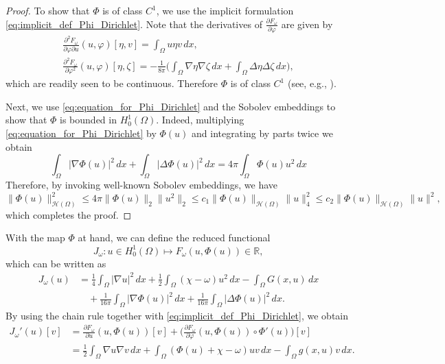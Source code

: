 \documentclass[reqno]{amsart}
\begin{document}
\begin{proof}
To show that $\Phi$ is of class $C^1$, we use the implicit formulation 
\eqref{eq:implicit_def_Phi_Dirichlet}. Note that the derivatives of 
$\frac{\partial F_\omega}{\partial \varphi}$ are given by
\begin{equation}
\begin{gathered}
  \frac{\partial^2 F_\omega}{\partial \varphi \partial u} (u, \varphi)[\eta, v]
  = \int_\Omega u \eta v \,dx,  \\
  \frac{\partial^2 F_\omega}{\partial \varphi^2} (u, \varphi) [\eta, \zeta]
   = - \frac{1}{8\pi} \Big(\int_\Omega \nabla \eta \nabla \zeta \,dx
   + \int_\Omega \Delta \eta \Delta \zeta \,dx \Big),
\end{gathered}
\end{equation}
which are readily seen to be continuous. Therefore $\Phi$ is of class $C^1$
(see, e.g., \cite{AmbrosettiProdi1993}).

Next, we  use \eqref{eq:equation_for_Phi_Dirichlet} and the Sobolev embeddings to 
show that $\Phi$ is bounded in $H_0^1(\Omega)$. Indeed, multiplying 
\eqref{eq:equation_for_Phi_Dirichlet} by $\Phi(u)$ and integrating by parts twice we 
obtain
\[
 \int_\Omega |\nabla \Phi(u)|^2 \,dx + \int_\Omega |\Delta \Phi(u)|^2 \,dx = 4 \pi \int_\Omega \Phi(u) u^2 \,dx
\]
Therefore, by invoking well-known Sobolev embeddings, we have
\[
 \|\Phi(u)\|_{\mathcal{H}(\Omega)}^2
  \leq 4 \pi \|\Phi(u)\|_2 \|u^2\|_2  
  \leq c_1 \|\Phi(u)\|_{\mathcal{H}(\Omega)} \|u\|_4^2
  \leq c_2 \|\Phi(u)\|_{\mathcal{H}(\Omega)} \|u\|^2,
\]
 which completes the proof.
\end{proof}

With the map $\Phi$ at hand, we can define the  reduced functional
\[
 J_\omega : u \in H_0^1(\Omega) \mapsto F_\omega(u, \Phi(u)) \in \mathbb R,
\]
which can be written as
\begin{equation}
\begin{aligned}
 J_\omega(u)
 & = \frac{1}{4} \int_\Omega |\nabla u|^2 \,dx
  + \frac{1}{2} \int_\Omega (\chi - \omega) u^2 \,dx
  - \int_\Omega G(x, u) \,dx  \\
 & \quad + \frac{1}{16 \pi} \int_\Omega |\nabla \Phi(u)|^2 \,dx
 + \frac{1}{16 \pi} \int_\Omega |\Delta \Phi(u)|^2 \,dx.
\end{aligned}\label{eq:def_J}
\end{equation}
By using the chain rule together with \eqref{eq:implicit_def_Phi_Dirichlet}, we obtain
\begin{equation}
\begin{aligned}
 J_\omega'(u)[v]
 & = \frac{\partial F_\omega}{\partial u}(u, \Phi(u))[v]
  + \Big(\frac{\partial F_\omega}{\partial \varphi
 }(u, \Phi(u)) \circ \Phi'(u)\Big) [v]  \\
 & = \frac{1}{2} \int_\Omega \nabla u \nabla v \,dx + \int_\Omega (\Phi(u)
 + \chi - \omega) u v \,dx - \int_\Omega g(x, u) v \,dx.
\end{aligned} \label{eq:J_prime}
\end{equation}
\end{document}
